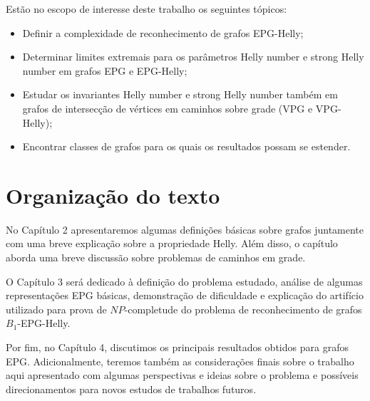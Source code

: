 Estão no escopo de interesse deste trabalho os seguintes tópicos:

\begin{itemize}
    
    \item Definir a complexidade de reconhecimento de grafos EPG-Helly;
    \item Determinar limites extremais para os parâmetros Helly number e strong Helly number em grafos EPG e EPG-Helly;
    
    \item Estudar os invariantes Helly number e strong Helly number também em grafos de intersecção de vértices em caminhos sobre grade (VPG e VPG-Helly);
    
    \item Encontrar classes de grafos para os quais os resultados possam se estender.
\end{itemize}









\section{Organização do texto}

No Capítulo 2 apresentaremos algumas definições básicas sobre grafos juntamente com uma breve explicação sobre a propriedade Helly. Além disso, o capítulo aborda uma breve discussão sobre problemas de caminhos em grade.

O Capítulo 3 será dedicado à definição do problema estudado, análise de algumas representações EPG básicas, demonstração de dificuldade e explicação do artifício utilizado para prova de $NP$-completude do problema de reconhecimento de grafos $B_1$-EPG-Helly.

Por fim, no Capítulo 4, discutimos os principais resultados obtidos para grafos EPG. Adicionalmente, teremos
também as considerações finais sobre o trabalho aqui apresentado com algumas perspectivas e ideias sobre o problema e possíveis direcionamentos para novos estudos de trabalhos futuros.